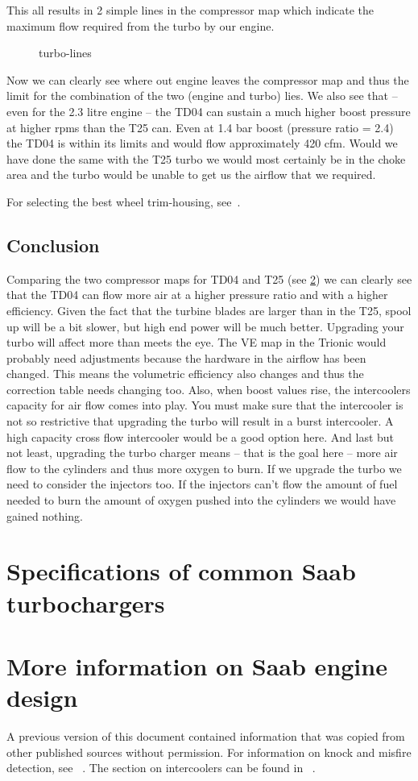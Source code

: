 \documentclass[11pt,a4paper]{book}
\newcommand{\Mfig}[1]{%
\begin{figure}
    \centering
    \missingfigure{#1}
    \caption{#1}
\end{figure}}
\begin{document}
This all results in 2 simple lines in the compressor map which indicate the maximum flow required
from the turbo by our engine.
\Mfig{turbo-lines}
Now we can clearly see where out engine leaves the compressor map and thus the limit for the
combination of the two (engine and turbo) lies.
We also see that – even for the 2.3 litre engine – the TD04 can sustain a much higher boost pressure
at higher rpms than the T25 can. Even at 1.4 bar boost (pressure ratio = 2.4) the TD04 is within its
limits and would flow approximately 420 cfm. Would we have done the same with the T25 turbo we
would most certainly be in the choke area and the turbo would be unable to get us the airflow that we
required.

For selecting the best wheel trim-housing, see~\cite{isaac-lowry_turbo_2004}.

\section{Conclusion}
Comparing the two compressor maps for TD04 and T25 (see \cref{chap:turbo-specs}) we can clearly see that the TD04 can flow
more air at a higher pressure ratio and with a higher efficiency. Given the fact that the turbine blades
are larger than in the T25, spool up will be a bit slower, but high end power will be much better.
Upgrading your turbo will affect more than meets the eye. The VE map in the Trionic would probably
need adjustments because the hardware in the airflow has been changed. This means the volumetric
efficiency also changes and thus the correction table needs changing too.
Also, when boost values rise, the intercoolers capacity for air flow comes into play. You must make
sure that the intercooler is not so restrictive that upgrading the turbo will result in a burst intercooler.
A high capacity cross flow intercooler would be a good option here.
And last but not least, upgrading the turbo charger means – that is the goal here – more air flow to
the cylinders and thus more oxygen to burn. If we upgrade the turbo we need to consider the
injectors too. If the injectors can’t flow the amount of fuel needed to burn the amount of oxygen
pushed into the cylinders we would have gained nothing.

\chapter{Specifications of common Saab turbochargers}\label{chap:turbo-specs}

\chapter{More information on Saab engine design}
A previous version of this document contained information that was copied
from other published sources without permission. For information on knock and
misfire detection, see
\citeauthor{eriksson_closed_1998}~\cite{eriksson_closed_1998}. The section on
intercoolers can be found in
\citeauthor{ferozepuria_turbocharger}~\cite{ferozepuria_turbocharger}.
\printindex

\printbibliography
\end{document}
